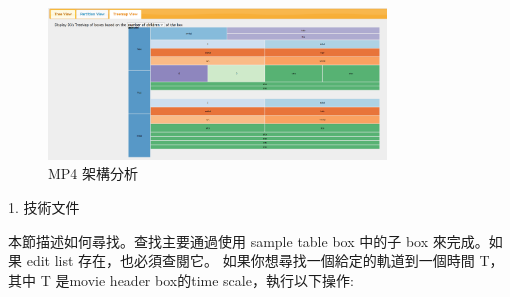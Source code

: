 \documentclass[10pt,UTF8]{ctexart}
\begin{document}
\begin{figure}[H]
\centering 
\includegraphics[width=0.80\textwidth]{m3.png} 
\caption{MP4 架構分析 }
\label{Test}
\end{figure}


1. 技術文件

本節描述如何尋找。查找主要通過使⽤ sample table box 中的⼦ box 來完成。如果 edit list 存在，也必須查閱它。 如果你想尋找⼀個給定的軌道到⼀個時間 T，其中 T 是movie header box的time scale，執⾏以下操作:
\end{document}
